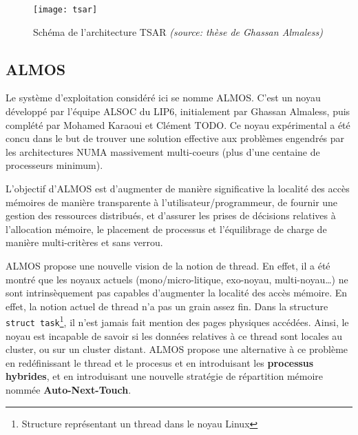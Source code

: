     \begin{figure}[!h]
      \centering
      \texttt{[image: tsar]}
      \caption{Schéma de l'architecture TSAR \textit{(source: thèse de Ghassan
          Almaless\cite{almos-phd})}}
      \label{fig:tsar}
    \end{figure}


  \subsection{ALMOS}
  \label{subsec:almos}


    Le système d'exploitation considéré ici se nomme ALMOS\cite{almos}. C'est un
    noyau développé par l'équipe ALSOC du LIP6, initialement par Ghassan
    Almaless, puis complété par Mohamed Karaoui et Clément TODO. Ce noyau
    expérimental a été concu dans le but de trouver une solution effective aux
    problèmes engendrés par les architectures NUMA massivement multi-coeurs
    (plus d'une centaine de processeurs minimum).

    L'objectif d'ALMOS est d'augmenter de manière significative la localité des
    accès mémoires de manière transparente à l'utilisateur/programmeur, de
    fournir une gestion des ressources distribués, et d'assurer les
    prises de décisions relatives à l'allocation mémoire, le placement de
    processus et l'équilibrage de charge de manière multi-critères et sans
    verrou.

    ALMOS propose une nouvelle vision de la notion de thread. En effet, il a été
    montré que les noyaux actuels (mono/micro-litique, exo-noyau,
    multi-noyau\ldots) ne sont intrinsèquement pas capables d'augmenter la
    localité des accès mémoire. En effet, la notion actuel de thread n'a pas un
    grain assez fin. Dans la structure \texttt{struct task}\footnote{Structure
      représentant un thread dans le noyau Linux}, il n'est jamais fait mention
    des pages physiques accédées. Ainsi, le noyau est incapable de savoir si les
    données relatives à ce thread sont locales au cluster, ou sur un cluster
    distant. ALMOS propose une alternative à ce problème en redéfinissant le
    thread et le procesus et en introduisant les \textbf{processus hybrides}, et
    en introduisant une nouvelle stratégie de répartition mémoire nommée
    \textbf{Auto-Next-Touch}.
